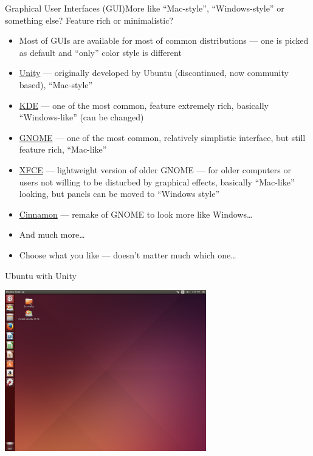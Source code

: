 \documentclass[compress, ucs, xelatex, 11pt, xcolor=svgnames,
  hyperref={
    bookmarks=true,
    unicode=true,
    colorlinks=true,
    pdftitle={Linux, command line and MetaCentrum},
    plainpages=false,
    pdfauthor={Vojtech Zeisek},
    pdfsubject={Course about use of Linux command line, writing shell scripts and using MetaCentrum of CESNET},
    pdfcreator={XeLaTeX},
    pdfkeywords={Linux, GNU, BASH, shell, command line, MetaCentrum},
    linkcolor=DarkRed,
    anchorcolor=DarkBlue,
    citecolor=Indigo,
    filecolor=NavyBlue,
    menucolor=DarkMagenta,
    urlcolor=DarkBlue,
    pdftex},
  url={hyphens, lowtilde} %
  ]{beamer}
\begin{document}
\begin{frame}{Graphical User Interfaces (GUI)}{More like ``Mac-style'', ``Windows-style'' or something else? Feature rich or minimalistic?}
  \begin{itemize}
    \item Most of GUIs are available for most of common distributions --- one is picked as default and ``only'' color style is different
    \item \href{https://code.launchpad.net/unity}{Unity} --- originally developed by Ubuntu (discontinued, now community based), ``Mac-style''
    \item \href{https://www.kde.org/}{KDE} --- one of the most common, feature extremely rich, basically ``Windows-like'' (can be changed)
    \item \href{https://www.gnome.org/}{GNOME} --- one of the most common, relatively simplistic interface, but still feature rich, ``Mac-like''
    \item \href{http://xfce.org/}{XFCE} --- lightweight version of older GNOME --- for older computers or users not willing to be disturbed by graphical effects, basically ``Mac-like'' looking, but panels can be moved to ``Windows style''
    \item \href{http://developer.linuxmint.com/projects/cinnamon-projects.html}{Cinnamon} --- remake of GNOME to look more like Windows\ldots
    \item And much more\ldots
    \item Choose what you like --- doesn't matter much which one\ldots
  \end{itemize}
\end{frame}

\begin{frame}{Ubuntu with Unity} %
  \begin{center}
    \includegraphics[height=7cm]{ubuntu.png}
  \end{center}
\end{frame}
\end{document}

